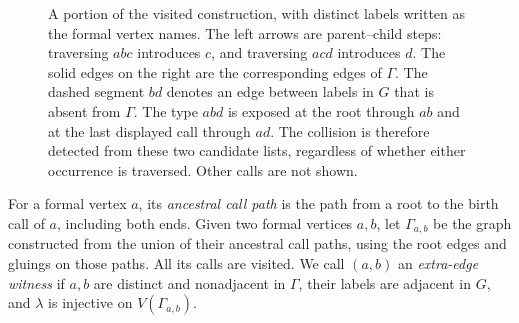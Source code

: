 \begin{figure}[htbp]
\centering
{}
\caption{A portion of the visited construction, with distinct labels
written as the formal vertex names. The left arrows are parent--child steps:
traversing $abc$ introduces $c$, and traversing $acd$ introduces $d$.
The solid edges on the right are the corresponding edges of $\Gamma$.
The dashed segment $bd$ denotes an edge between labels in $G$ that is
absent from $\Gamma$. The type $abd$ is exposed at the root through $ab$
and at the last displayed call through $ad$. The collision is therefore detected from
these two candidate lists, regardless of whether either occurrence is
traversed. Other calls are not shown.}
\label{fig:call-graph}
\end{figure}

For a formal vertex $a$, its \emph{ancestral call path} is the path
from a root to the birth call of $a$, including both ends.  Given two
formal vertices $a,b$, let $\Gamma_{a,b}$ be the graph constructed from
the union of their ancestral call paths, using the root edges and
gluings on those paths.  All its calls are visited.  We call $(a,b)$
an \emph{extra-edge witness} if $a,b$ are distinct and nonadjacent in
$\Gamma$, their labels are adjacent in $G$, and $\lambda$ is injective
on $V(\Gamma_{a,b})$.

